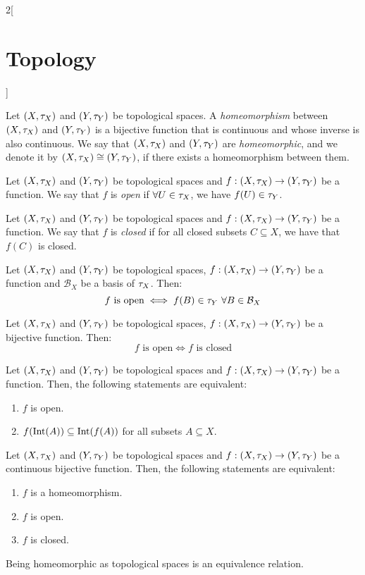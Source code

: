 \documentclass[../../../main.tex]{subfiles}
\begin{document}
\begin{multicols}{2}[\section{Topology}]
\begin{prop}
  \end{prop}
  \begin{definition}
    Let $(X,\tau_X)$ and $(Y,\tau_Y)$ be topological spaces. A \emph{homeomorphism} between $(X,\tau_X)$ and $(Y,\tau_Y)$ is a bijective function that is continuous and whose inverse is also continuous. We say that $(X,\tau_X)$ and $(Y,\tau_Y)$ are \emph{homeomorphic}, and we denote it by $(X,\tau_X)\cong(Y,\tau_Y)$, if there exists a homeomorphism between them.
  \end{definition}
  \begin{definition}
    Let $(X,\tau_X)$ and $(Y,\tau_Y)$ be topological spaces and $f:(X,\tau_X)\rightarrow (Y,\tau_Y)$ be a function. We say that $f$ is \emph{open} if $\forall U\in\tau_X$, we have $f(U)\in \tau_Y$.
  \end{definition}
  \begin{definition}
    Let $(X,\tau_X)$ and $(Y,\tau_Y)$ be topological spaces and $f:(X,\tau_X)\rightarrow (Y,\tau_Y)$ be a function. We say that $f$ is \emph{closed} if for all closed subsets $C\subseteq X$, we have that $f(C)$ is closed.
  \end{definition}
  \begin{theorem}
    Let $(X,\tau_X)$ and $(Y,\tau_Y)$ be topological spaces, $f:(X,\tau_X)\rightarrow (Y,\tau_Y)$ be a function and $\mathcal{B}_X$ be a basis of $\tau_X$. Then: $$f\text{ is open}\iff f(B)\in\tau_Y\ \forall B\in \mathcal{B}_X$$
  \end{theorem}
  \begin{theorem}
    Let $(X,\tau_X)$ and $(Y,\tau_Y)$ be topological spaces, $f:(X,\tau_X)\rightarrow (Y,\tau_Y)$ be a bijective function. Then: $$f\text{ is open}\iff f\text{ is closed}$$
  \end{theorem}
  \begin{prop}
    Let $(X,\tau_X)$ and $(Y,\tau_Y)$ be topological spaces and $f:(X,\tau_X)\rightarrow (Y,\tau_Y)$ be a function. Then, the following statements are equivalent:
    \begin{enumerate}
      \item $f$ is open.
      \item $f(\operatorname{Int}(A))\subseteq \operatorname{Int}(f(A))$ for all subsets $A\subseteq X$.
    \end{enumerate}
  \end{prop}
  \begin{prop}
    Let $(X,\tau_X)$ and $(Y,\tau_Y)$ be topological spaces and $f:(X,\tau_X)\rightarrow (Y,\tau_Y)$ be a continuous bijective function. Then, the following statements are equivalent:
    \begin{enumerate}
      \item $f$ is a homeomorphism.
      \item $f$ is open.
      \item $f$ is closed.
    \end{enumerate}
  \end{prop}
  \begin{prop}
    Being homeomorphic as topological spaces is an equivalence relation.
  \end{prop}

\end{multicols}
\end{document}
